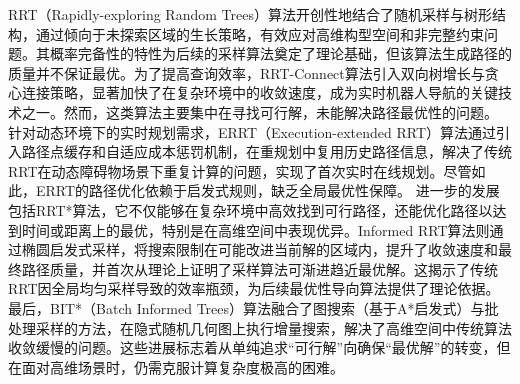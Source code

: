 \documentclass[master,academic]{ysuthesis} %
\begin{document}
		RRT（Rapidly-exploring Random Trees）算法开创性地结合了随机采样与树形结构，通过倾向于未探索区域的生长策略，有效应对高维构型空间和非完整约束问题。其概率完备性的特性为后续的采样算法奠定了理论基础，但该算法生成路径的质量并不保证最优。为了提高查询效率，RRT-Connect算法引入双向树增长与贪心连接策略，显著加快了在复杂环境中的收敛速度，成为实时机器人导航的关键技术之一。然而，这类算法主要集中在寻找可行解，未能解决路径最优性的问题。
		针对动态环境下的实时规划需求，ERRT（Execution-extended RRT）算法通过引入路径点缓存和自适应成本惩罚机制，在重规划中复用历史路径信息，解决了传统RRT在动态障碍物场景下重复计算的问题，实现了首次实时在线规划。尽管如此，ERRT的路径优化依赖于启发式规则，缺乏全局最优性保障。
		进一步的发展包括RRT*算法，它不仅能够在复杂环境中高效找到可行路径，还能优化路径以达到时间或距离上的最优，特别是在高维空间中表现优异。Informed RRT算法则通过椭圆启发式采样，将搜索限制在可能改进当前解的区域内，提升了收敛速度和最终路径质量，并首次从理论上证明了采样算法可渐进趋近最优解。这揭示了传统RRT因全局均匀采样导致的效率瓶颈，为后续最优性导向算法提供了理论依据。
		最后，BIT*（Batch Informed Trees）算法融合了图搜索（基于A*启发式）与批处理采样的方法，在隐式随机几何图上执行增量搜索，解决了高维空间中传统算法收敛缓慢的问题。这些进展标志着从单纯追求“可行解”向确保“最优解”的转变，但在面对高维场景时，仍需克服计算复杂度极高的困难。
\end{document}
